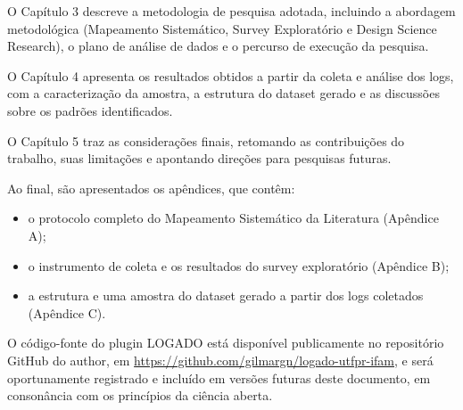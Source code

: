 O Capítulo 3 descreve a metodologia de pesquisa adotada, incluindo a abordagem metodológica (Mapeamento Sistemático, Survey Exploratório e Design Science Research), o plano de análise de dados e o percurso de execução da pesquisa.

O Capítulo 4 apresenta os resultados obtidos a partir da coleta e análise dos logs, com a caracterização da amostra, a estrutura do dataset gerado e as discussões sobre os padrões identificados.

O Capítulo 5 traz as considerações finais, retomando as contribuições do trabalho, suas limitações e apontando direções para pesquisas futuras.

Ao final, são apresentados os apêndices, que contêm:
\begin{itemize}
    \item o protocolo completo do Mapeamento Sistemático da Literatura (Apêndice A);
    \item o instrumento de coleta e os resultados do survey exploratório (Apêndice B);
    \item a estrutura e uma amostra do dataset gerado a partir dos logs coletados (Apêndice C).
\end{itemize}

O código-fonte do plugin LOGADO está disponível publicamente no repositório GitHub do author, em \url{https://github.com/gilmargn/logado-utfpr-ifam}, e será oportunamente registrado e incluído em versões futuras deste documento, em consonância com os princípios da ciência aberta.